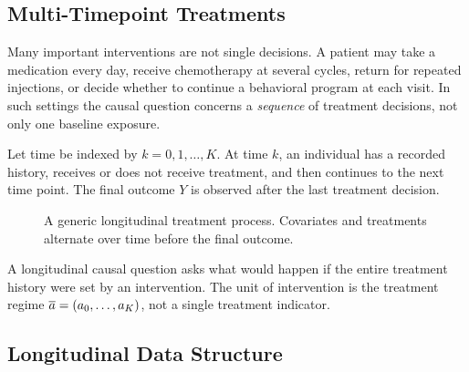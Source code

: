 \label{lec:8-1}

\subsection{Multi-Timepoint Treatments}

Many important interventions are not single decisions. A patient may take a
medication every day, receive chemotherapy at several cycles, return for repeated
injections, or decide whether to continue a behavioral program at each visit. In
such settings the causal question concerns a \emph{sequence} of treatment
decisions, not only one baseline exposure.

Let time be indexed by $k=0,1,\ldots,K$. At time $k$, an individual has a
recorded history, receives or does not receive treatment, and then continues to
the next time point. The final outcome $Y$ is observed after the last treatment
decision.

\begin{figure}[H]
\centering
{}
\caption{A generic longitudinal treatment process. Covariates and treatments alternate over time before the final outcome.}
\label{fig:ch8-longitudinal-timeline}
\end{figure}

\begin{keyidea}
A longitudinal causal question asks what would happen if the entire treatment
history were set by an intervention. The unit of intervention is the treatment
regime $\overline{a}=(a_0,\ldots,a_K)$, not a single treatment indicator.
\end{keyidea}

\subsection{Longitudinal Data Structure}

